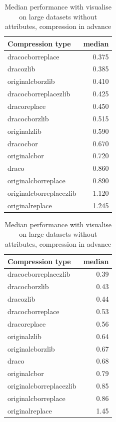   \begin{table}[!h]
    \begin{minipage}{.5\linewidth}
      \caption{
Median performance with visualise on large datasets, compression in advance}
\centering

\begin{tabular}{|l|r|}
\hline
Compression type & median\\
\hline
dracocborreplace & 0.375\\
\hline
dracozlib & 0.385\\
\hline
originalcborzlib & 0.410\\
\hline
dracocborreplacezlib & 0.425\\
\hline
dracoreplace & 0.450\\
\hline
dracocborzlib & 0.515\\
\hline
originalzlib & 0.590\\
\hline
dracocbor & 0.670\\
\hline
originalcbor & 0.720\\
\hline
draco & 0.860\\
\hline
originalcborreplace & 0.890\\
\hline
originalcborreplacezlib & 1.120\\
\hline
originalreplace & 1.245\\
\hline
\end{tabular}
\end{minipage}%
    \begin{minipage}{.5\linewidth}
      \centering
        \caption{
Median performance with visualise on large datasets without attributes, compression in advance}

\begin{tabular}{|l|r|}
\hline
Compression type & median\\
\hline
dracocborreplacezlib & 0.39\\
\hline
dracocborzlib & 0.43\\
\hline
dracozlib & 0.44\\
\hline
dracocborreplace & 0.53\\
\hline
dracoreplace & 0.56\\
\hline
originalzlib & 0.64\\
\hline
originalcborzlib & 0.67\\
\hline
draco & 0.68\\
\hline
originalcbor & 0.79\\
\hline
originalcborreplacezlib & 0.85\\
\hline
originalcborreplace & 0.86\\
\hline
originalreplace & 1.45\\
\hline
\end{tabular}
\end{minipage} 
\end{table}
